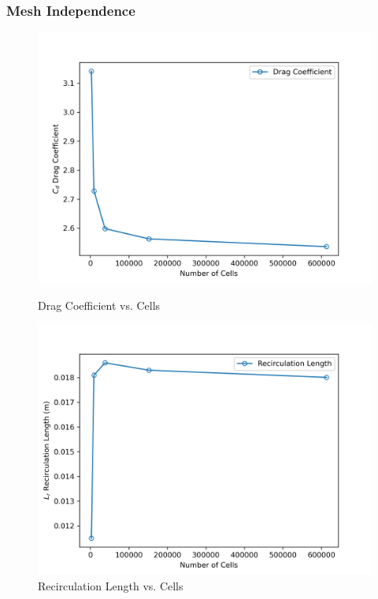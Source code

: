 \subsubsection{Mesh Independence}
\begin{figure}[H]
    \centering
    \begin{minipage}{0.45\textwidth}
        \centering
        \includegraphics[width=\textwidth]{Questions/Figures/drag_coefficient_vs_cells.png}
        \caption{Drag Coefficient vs. Cells}
        \label{fig:drag_coefficient_vs_cells}
    \end{minipage}
    \begin{minipage}{0.45\textwidth}
        \centering
        \includegraphics[width=\textwidth]{Questions/Figures/recirc_length_vs_cells.png}
        \caption{Recirculation Length vs. Cells}
        \label{fig:recirculation_length_vs_cells}
    \end{minipage}
\end{figure}

